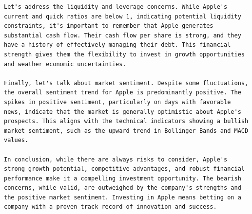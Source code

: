 \begin{tcolorbox}
\begin{lstlisting}[style=agentbase]
Let's address the liquidity and leverage concerns. While Apple's current and quick ratios are below 1, indicating potential liquidity constraints, it's important to remember that Apple generates substantial cash flow. Their cash flow per share is strong, and they have a history of effectively managing their debt. This financial strength gives them the flexibility to invest in growth opportunities and weather economic uncertainties.

Finally, let's talk about market sentiment. Despite some fluctuations, the overall sentiment trend for Apple is predominantly positive. The spikes in positive sentiment, particularly on days with favorable news, indicate that the market is generally optimistic about Apple's prospects. This aligns with the technical indicators showing a bullish market sentiment, such as the upward trend in Bollinger Bands and MACD values.

In conclusion, while there are always risks to consider, Apple's strong growth potential, competitive advantages, and robust financial performance make it a compelling investment opportunity. The bearish concerns, while valid, are outweighed by the company's strengths and the positive market sentiment. Investing in Apple means betting on a company with a proven track record of innovation and success.
\end{lstlisting}
\end{tcolorbox}

